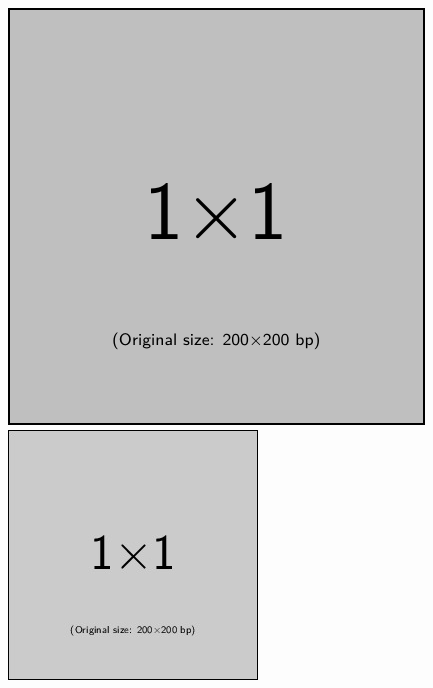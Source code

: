 \documentclass{article}
\begin{document}
\begin{figure}[t]
   \centering
   \begin{minipage}{.45\hsize}
      \centering
      \includegraphics[width=.8\hsize]{figure/example-image-pdf.pdf}%
   \end{minipage}
   \begin{minipage}{.45\hsize}
      \centering
      \includegraphics[width=.8\hsize]{figure/example-image-jpg.jpg}%

\end{minipage}
\end{figure}
\end{document}
